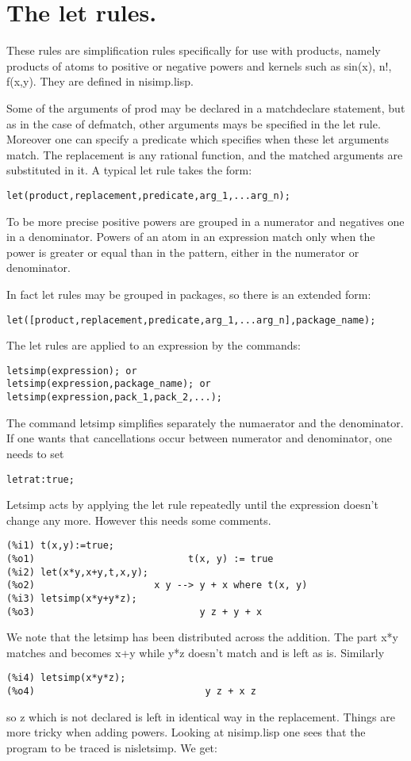 \documentclass[a4paper,11pt]{article}
\begin{document}
\section{The let rules.}

These rules are simplification rules specifically for use with
products, namely products of atoms to positive or negative powers and
kernels such as sin(x), n!, f(x,y).  They are defined in nisimp.lisp.

Some of the arguments of prod may be declared in a matchdeclare
statement, but as in the case of defmatch, other arguments mays be
specified in the let rule. Moreover one can specify a predicate which
specifies when these let arguments match. The replacement is any
rational function, and the matched arguments are substituted in it. A
typical let rule takes the form:

\begin{verbatim}
let(product,replacement,predicate,arg_1,...arg_n);
\end{verbatim}
To be more precise positive powers are grouped in a numerator and
negatives one in a denominator. Powers of an atom in an expression
match only when the power is greater or equal than in the pattern,
either in the numerator or denominator.


In fact let rules may be grouped in packages, so there is an extended form:

\begin{verbatim}
let([product,replacement,predicate,arg_1,...arg_n],package_name);
\end{verbatim}
The let rules are applied to an expression by the commands:

\begin{verbatim}
letsimp(expression); or
letsimp(expression,package_name); or
letsimp(expression,pack_1,pack_2,...);
\end{verbatim}
The command letsimp simplifies separately the numaerator and the denominator.
If one wants that cancellations occur between numerator and denominator,
one needs to set 
\begin{verbatim}
letrat:true;
\end{verbatim}
Letsimp acts by applying the let rule repeatedly until the expression
doesn't change any more. However this needs some comments.
\begin{verbatim}
(%i1) t(x,y):=true;
(%o1)                           t(x, y) := true
(%i2) let(x*y,x+y,t,x,y);
(%o2)                     x y --> y + x where t(x, y)
(%i3) letsimp(x*y+y*z);
(%o3)                             y z + y + x
\end{verbatim}
We note that the letsimp has been distributed across the addition. The part
x*y matches and becomes x+y while y*z doesn't match and is left as is.
Similarly 
\begin{verbatim}
(%i4) letsimp(x*y*z);
(%o4)                              y z + x z
\end{verbatim}
so z which is not declared is left in identical way in the replacement. Things are more
tricky when adding powers. Looking at nisimp.lisp one sees that the program to be
traced is nisletsimp. We get:
\end{document}
